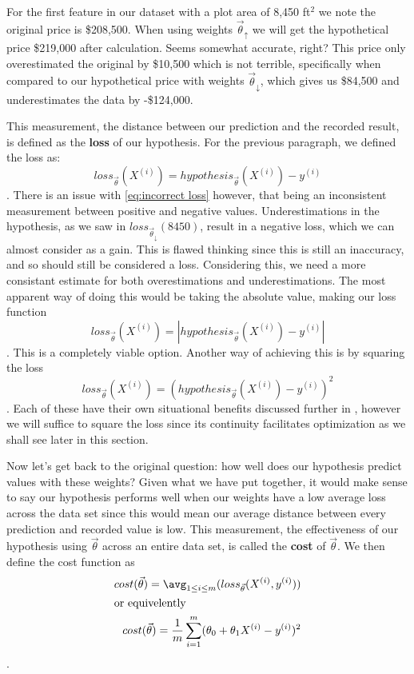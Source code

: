 For the first feature in our dataset with a plot area of 8,450 ft$^2$ we note the original price is \$208,500. When using weights $\vec\theta_{\uparrow}$ we will get the hypothetical price \$219,000 after calculation. Seems somewhat accurate, right? This price only overestimated the original by \$10,500 which is not terrible, specifically when compared to our hypothetical price  with weights $\vec\theta_{\downarrow}$, which gives us \$84,500 and underestimates the data by -\$124,000.

This measurement, the distance between our prediction and the recorded result,
is defined as the \textbf{loss} of our hypothesis. For the previous paragraph, we defined the loss as:
\begin{equation}\label{eq:incorrect loss}
	loss_{\vec\theta}(X^{(i)}) = hypothesis_{\vec\theta}(X^{(i)})-y^{(i)}
\end{equation}
. There is an issue with \ref{eq:incorrect loss} however, that being an inconsistent measurement between positive and negative values. Underestimations in the hypothesis, as we saw in $loss_{\vec\theta_{\downarrow}}(8450)$, result in a negative loss, which we can almost consider as a gain. This is flawed thinking since this is still an inaccuracy, and so should still be considered a loss. Considering this, we need a more consistant estimate for both overestimations and underestimations. The most apparent way of doing this would be taking the absolute value, making our loss function
\begin{equation}
	loss_{\vec\theta}(X^{(i)}) = |hypothesis_{\vec\theta}(X^{(i)}) - y^{(i)}|
\end{equation}
. This is a completely viable option. Another way of achieving this is by
squaring the loss
\begin{equation}
	loss_{\vec\theta}(X^{(i)}) = (hypothesis_{\vec\theta}(X^{(i)}) - y^{(i)})^2
\end{equation}
. Each of these have their own situational benefits discussed further in
\placeholder, however we will suffice to square the loss since its continuity
facilitates optimization as we shall see later in this section.

Now let's get back to the original question: how well does our hypothesis
predict values with these weights? Given what we have put together, it would
make sense to say our hypothesis performs well when our weights have a low
average loss across the data set since this would mean our average distance
between every prediction and recorded value is low. This measurement, the
effectiveness of our hypothesis using $\vec\theta$ across an entire data set, is
called the \textbf{cost} of $\vec\theta$. We then define the cost function as
\begin{subequations}
    \begin{align}
        cost(\vec\theta) = \avg_{1\leq i\leq m} (loss_{\vec\theta}(X^{(i)}, y^{(i)})) \\
    \intertext{or equivelently}
        cost(\vec\theta) = \frac{1}{m}\sum_{i=1}^m (\theta_0 + \theta_1X^{(i)} -
        y^{(i)})^2
    \end{align}
\end{subequations}
.


